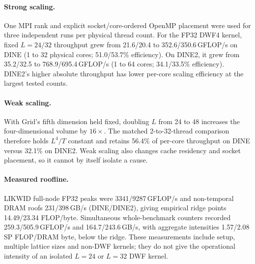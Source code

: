 
\paragraph{Strong scaling.}
One MPI rank and explicit socket/core-ordered OpenMP placement were used for
three independent runs per physical thread count. For the FP32 DWF4 kernel,
fixed $L=24/32$ throughput grew from 21.6/20.4 to 352.6/350.6\,GFLOP/s
on DINE (1 to 32 physical cores; 51.0/53.7\% efficiency). On DINE2, it grew
from 35.2/32.5 to 768.9/695.4\,GFLOP/s (1 to 64 cores;
34.1/33.5\% efficiency). DINE2's higher absolute throughput has lower
per-core scaling efficiency at the largest tested counts.

\paragraph{Weak scaling.}
With Grid's fifth dimension held fixed, doubling $L$ from 24 to 48 increases
the four-dimensional volume by $16\times$. The matched 2-to-32-thread
comparison therefore holds $L^4/T$ constant and retains 56.4\% of per-core
throughput on DINE versus 32.1\% on DINE2. Weak scaling also changes cache
residency and socket placement, so it cannot by itself isolate a cause.

\paragraph{Measured roofline.}
LIKWID full-node FP32 peaks were 3341/9287\,GFLOP/s and non-temporal
DRAM roofs 231/398\,GB/s (DINE/DINE2), giving empirical ridge points
14.49/23.34 FLOP/byte. Simultaneous whole-benchmark counters recorded
259.3/505.9\,GFLOP/s and 164.7/243.6\,GB/s, with aggregate intensities
1.57/2.08 SP FLOP/DRAM byte, below the ridge. These measurements include
setup, multiple lattice sizes and non-DWF kernels; they do not give the
operational intensity of an isolated $L=24$ or $L=32$ DWF kernel.

